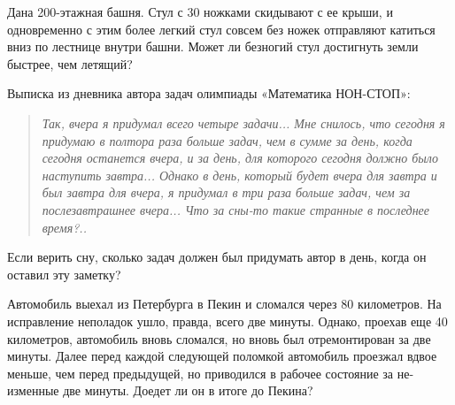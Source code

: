 ﻿

\begin{itemize}
\itA Дана 200-этажная башня. Стул с 30 ножками скидывают с ее крыши, и одновременно с этим более легкий стул совсем без ножек отправляют катиться вниз по лестнице внутри башни. Может ли безногий стул достигнуть земли быстрее, чем летящий?

\itB Выписка из дневника автора задач олимпиады «Математика НОН-СТОП»:

\begin{quote}
\itshape Так, вчера я придумал всего четыре задачи... Мне снилось, что сегодня я придумаю в полтора раза больше задач, чем в сумме за день, когда сегодня останется вчера, и за день, для которого сегодня должно было наступить завтра... Однако в день, который будет вчера для завтра и был завтра для вчера, я придумал в три раза больше задач, чем за послезавтрашнее вчера... Что за сны-то такие странные в последнее время?..
\end{quote}

\noindent Если верить сну, сколько задач должен был придумать автор в день, когда он оставил эту заметку?

\itC Автомобиль выехал из Петербурга в Пекин и сломался через 80 километров. На исправление неполадок ушло, правда, всего две минуты. Однако, проехав еще 40 километров, автомобиль вновь сломался, но вновь был отремонтирован за две минуты. Далее перед каждой следующей поломкой автомобиль проезжал вдвое меньше, чем перед предыдущей, но приводился в рабочее состояние за не- изменные две минуты. Доедет ли он в итоге до Пекина?
\end{itemize}